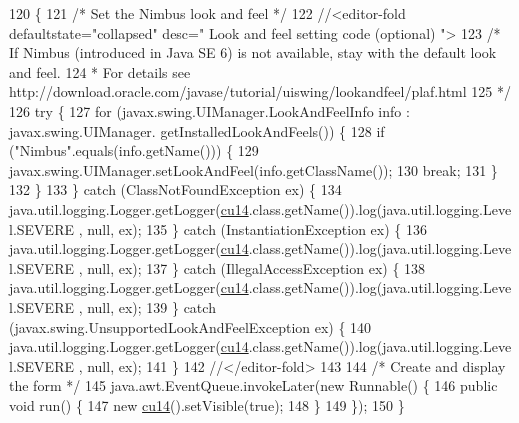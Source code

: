 \begin{DoxyCode}
120                                            \{
121         \textcolor{comment}{/* Set the Nimbus look and feel */}
122         \textcolor{comment}{//<editor-fold defaultstate="collapsed" desc=" Look and feel setting code (optional) ">}
123         \textcolor{comment}{/* If Nimbus (introduced in Java SE 6) is not available, stay with the default look and feel.}
124 \textcolor{comment}{         * For details see http://download.oracle.com/javase/tutorial/uiswing/lookandfeel/plaf.html }
125 \textcolor{comment}{         */}
126         \textcolor{keywordflow}{try} \{
127             \textcolor{keywordflow}{for} (javax.swing.UIManager.LookAndFeelInfo info : javax.swing.UIManager.
      getInstalledLookAndFeels()) \{
128                 \textcolor{keywordflow}{if} (\textcolor{stringliteral}{"Nimbus"}.equals(info.getName())) \{
129                     javax.swing.UIManager.setLookAndFeel(info.getClassName());
130                     \textcolor{keywordflow}{break};
131                 \}
132             \}
133         \} \textcolor{keywordflow}{catch} (ClassNotFoundException ex) \{
134             java.util.logging.Logger.getLogger(\mbox{\hyperlink{classinterfacessoguar_1_1cu14_a0d92e122ad24e9589bfceac28cc7e92a}{cu14}}.class.getName()).log(java.util.logging.Level.SEVERE
      , null, ex);
135         \} \textcolor{keywordflow}{catch} (InstantiationException ex) \{
136             java.util.logging.Logger.getLogger(\mbox{\hyperlink{classinterfacessoguar_1_1cu14_a0d92e122ad24e9589bfceac28cc7e92a}{cu14}}.class.getName()).log(java.util.logging.Level.SEVERE
      , null, ex);
137         \} \textcolor{keywordflow}{catch} (IllegalAccessException ex) \{
138             java.util.logging.Logger.getLogger(\mbox{\hyperlink{classinterfacessoguar_1_1cu14_a0d92e122ad24e9589bfceac28cc7e92a}{cu14}}.class.getName()).log(java.util.logging.Level.SEVERE
      , null, ex);
139         \} \textcolor{keywordflow}{catch} (javax.swing.UnsupportedLookAndFeelException ex) \{
140             java.util.logging.Logger.getLogger(\mbox{\hyperlink{classinterfacessoguar_1_1cu14_a0d92e122ad24e9589bfceac28cc7e92a}{cu14}}.class.getName()).log(java.util.logging.Level.SEVERE
      , null, ex);
141         \}
142         \textcolor{comment}{//</editor-fold>}
143 
144         \textcolor{comment}{/* Create and display the form */}
145         java.awt.EventQueue.invokeLater(\textcolor{keyword}{new} Runnable() \{
146             \textcolor{keyword}{public} \textcolor{keywordtype}{void} run() \{
147                 \textcolor{keyword}{new} \mbox{\hyperlink{classinterfacessoguar_1_1cu14_a0d92e122ad24e9589bfceac28cc7e92a}{cu14}}().setVisible(\textcolor{keyword}{true});
148             \}
149         \});
150     \}
\end{DoxyCode}


